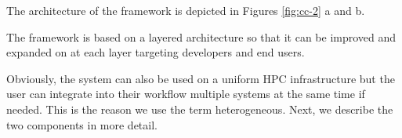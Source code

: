 \documentclass[utf8]{FrontiersinVancouver} %
\begin{document}
The architecture of the framework is depicted in Figures \ref{fig:cc-2} a and b. 

The framework is based on a layered architecture so that
it can be improved and expanded on at each layer targeting
developers and end users.

Obviously, the system can also be used on a uniform HPC infrastructure but the user can integrate into their workflow multiple systems at the same time if needed. This is the reason we use the term heterogeneous. Next, we describe the two components in more detail.

\begin{figure}[htb]

\end{figure}
\end{document}
